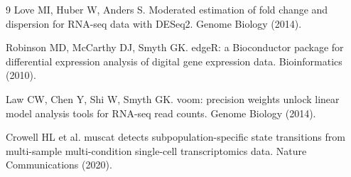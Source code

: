 \documentclass[11pt]{article}
\begin{document}
\begin{thebibliography}{9}
Love MI, Huber W, Anders S.
Moderated estimation of fold change and dispersion for RNA-seq data with DESeq2.
Genome Biology (2014).

Robinson MD, McCarthy DJ, Smyth GK.
edgeR: a Bioconductor package for differential expression analysis of digital gene expression data.
Bioinformatics (2010).

Law CW, Chen Y, Shi W, Smyth GK.
voom: precision weights unlock linear model analysis tools for RNA-seq read counts.
Genome Biology (2014).

Crowell HL et al.
muscat detects subpopulation-specific state transitions from multi-sample multi-condition single-cell transcriptomics data.
Nature Communications (2020).
\end{thebibliography}
\end{document}

